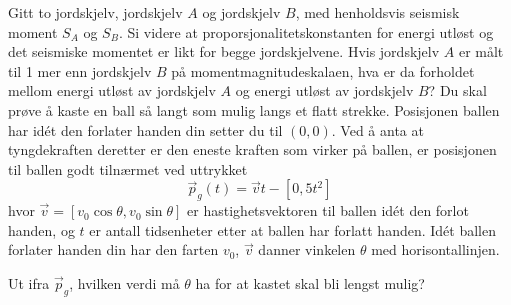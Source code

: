 Gitt to jordskjelv, jordskjelv $ A $ og jordskjelv $ B $, med henholdsvis seismisk moment $ S_A $ og $ S_B $. Si videre at proporsjonalitetskonstanten for energi utløst og det seismiske momentet er likt for begge jordskjelvene. Hvis jordskjelv $ A $ er målt til 1 mer enn jordskjelv $ B $ på momentmagnitudeskalaen, hva er da forholdet mellom energi utløst av jordskjelv $ A $ og energi utløst av jordskjelv $ B $? 
\newpage
{}
Du skal prøve å kaste en ball så langt som mulig langs et flatt strekke. Posisjonen ballen har idét den forlater handen din setter du til $ (0, 0) $. Ved å anta at tyngdekraften deretter er den eneste kraften som virker på ballen, er posisjonen til ballen godt tilnærmet ved uttrykket
\[ \vec{p}_g(t)=\vec{v}t-[0, 5t^2] \]
hvor $ \vec{v}=[v_0 \cos \theta, v_0 \sin \theta] $ er hastighetsvektoren til ballen idét den forlot handen, og $ t $ er antall tidsenheter etter at ballen har forlatt handen. Idét ballen forlater handen din har den farten $ v_0 $, $ \vec{v} $ danner vinkelen $ \theta $ med horisontallinjen.\vsk 

Ut ifra $ \vec{p}_g $, hvilken verdi må $ \theta $ ha for at kastet skal bli lengst mulig?



